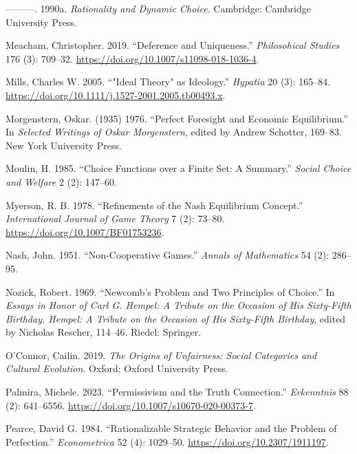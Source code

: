 \documentclass[
  12pt,
  letterpaper,
  DIV=11,
  numbers=noendperiod]{scrreprt}
\newlength{\cslhangindent}
\newenvironment{CSLReferences}[2] %
 {\begin{list}{}{%
  \setlength{\itemindent}{0pt}
  \setlength{\leftmargin}{0pt}
  \setlength{\parsep}{0pt}
  \ifodd #1
   \setlength{\leftmargin}{\cslhangindent}
   \setlength{\itemindent}{-1\cslhangindent}
  \fi
  \setlength{\itemsep}{#2\baselineskip}}}
 {\end{list}}
\begin{document}
\begin{CSLReferences}{1}{0}
---------. 1990a. \emph{Rationality and Dynamic Choice}. Cambridge:
Cambridge University Press.

Meacham, Christopher. 2019. {``Deference and Uniqueness.''}
\emph{Philosohical Studies} 176 (3): 709--32.
\url{https://doi.org/10.1007/s11098-018-1036-4}.

Mills, Charles W. 2005. {``"Ideal Theory" as Ideology.''} \emph{Hypatia}
20 (3): 165--84.
\url{https://doi.org/10.1111/j.1527-2001.2005.tb00493.x}.

Morgenstern, Oskar. (1935) 1976. {``Perfect Foresight and Economic
Equilibrium.''} In \emph{Selected Writings of Oskar Morgenstern}, edited
by Andrew Schotter, 169--83. New York University Press.

Moulin, H. 1985. {``Choice Functions over a Finite Set: A Summary.''}
\emph{Social Choice and Welfare} 2 (2): 147--60.

Myerson, R. B. 1978. {``Refinements of the Nash Equilibrium Concept.''}
\emph{International Journal of Game Theory} 7 (2): 73--80.
\url{https://doi.org/10.1007/BF01753236}.

Nash, John. 1951. {``Non-Cooperative Games.''} \emph{Annals of
Mathematics} 54 (2): 286--95.

Nozick, Robert. 1969. {``Newcomb's Problem and Two Principles of
Choice.''} In \emph{Essays in Honor of Carl {G}. Hempel: A Tribute on
the Occasion of His Sixty-Fifth Birthday. Hempel: A Tribute on the
Occasion of His Sixty-Fifth Birthday}, edited by Nicholas Rescher,
114--46. Riedel: Springer.

O'Connor, Cailin. 2019. \emph{The Origins of Unfairness: Social
Categories and Cultural Evolution}. Oxford: {O}xford {U}niversity
{P}ress.

Palmira, Michele. 2023. {``Permissivism and the Truth Connection.''}
\emph{Erkenntnis} 88 (2): 641--6556.
\url{https://doi.org/10.1007/s10670-020-00373-7}.

Pearce, David G. 1984. {``Rationalizable Strategic Behavior and the
Problem of Perfection.''} \emph{Econometrica} 52 (4): 1029--50.
\url{https://doi.org/10.2307/1911197}.


\end{CSLReferences}
\end{document}
